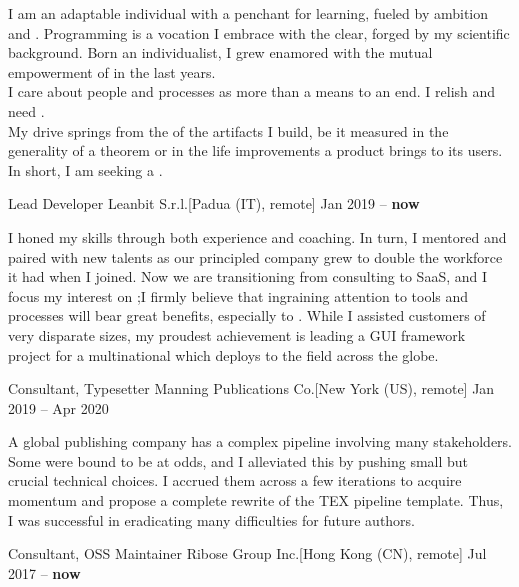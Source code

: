 \documentclass[9pt]{scrartcl}
\def\Phi{1.618}
\newlength{\Pad}\setlength{\Pad}{14.562pt} %
\begin{document}

I am an adaptable individual with a penchant for learning, fueled by ambition
and .
Programming is a vocation I embrace with the clear, 
forged by my scientific background.
Born an individualist, I grew enamored with the mutual empowerment of
 in the last years.\\[\smallskipamount]
I care about people and processes as more than a means to an end.
I relish and need .\\
My drive springs from the  of the artifacts I build, be
it measured in the generality of a theorem or in the life improvements a
product brings to its users. In short, I am seeking a .


\Event
  {Lead Developer}
  {Leanbit S.r.l.}[Padua (IT), remote]
  {Jan 2019 -- \textbf{now}}

I honed my  skills through both experience and coaching. In
turn, I mentored and paired with new talents as our  principled company
grew to double the workforce it had when I joined.
%
Now we are transitioning from consulting to SaaS, and I focus my interest on
;\linebreak I firmly believe that ingraining attention to tools
and processes will bear great benefits, especially to .
%
While I assisted customers of very disparate sizes, my proudest achievement is
leading a GUI framework project for a multinational which deploys to the field
across the globe.

\smallskip

\Event
  {Consultant, Typesetter}
  {Manning Publications Co.}[New York (US), remote]
  {Jan 2019 -- Apr 2020}

A global publishing company has a complex pipeline involving many stakeholders.
Some were bound to be at odds, and I alleviated this by pushing small but
crucial technical choices.
%
I  accrued them across a few iterations
to acquire momentum and propose a complete rewrite of the TEX pipeline template.
Thus, I was successful in eradicating many difficulties for future authors.

\smallskip

\Event
  {Consultant, OSS Maintainer}
  {Ribose Group Inc.}[Hong Kong (CN), remote]
  {Jul 2017 -- \textbf{now}}
\end{document}
